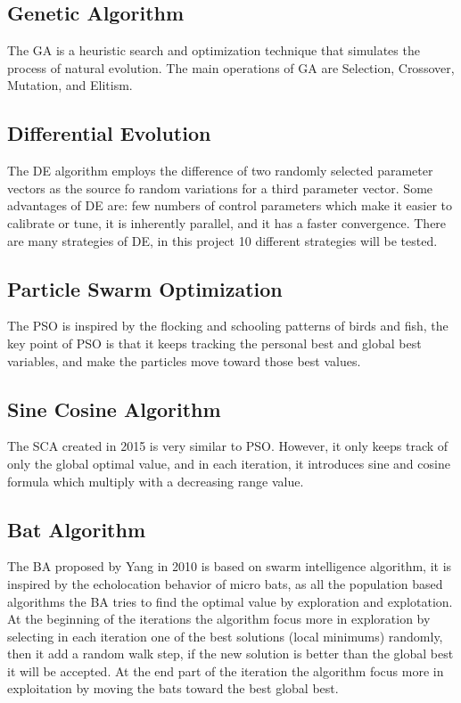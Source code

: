 \documentclass[12pt]{article}
\begin{document}
	\subsection{Genetic Algorithm}
    
    The GA is a heuristic search and optimization technique that simulates the process of natural evolution. The main operations of GA are Selection, Crossover, Mutation, and Elitism.
    
    \subsection{Differential Evolution}
    The DE algorithm employs the difference of two randomly selected parameter vectors as the source fo random variations for a third parameter vector. Some advantages of DE are: few numbers of control parameters which make it easier to calibrate or tune, it is inherently parallel, and it has a faster convergence. 
    There are many strategies of DE, in this project 10 different strategies will be tested.
    
    \subsection{Particle Swarm Optimization}
    The PSO is inspired by the flocking and schooling patterns of birds and fish, the key point of PSO is that it keeps tracking the personal best and global best variables, and make the particles move toward those best values.
    
	\subsection{Sine Cosine Algorithm}
    The SCA created in 2015 is very similar to PSO. However, it only keeps track of only the global optimal value, and in each iteration, it introduces sine and cosine formula which multiply with a decreasing range value.
    
	\subsection{Bat Algorithm}
	The BA proposed by Yang in 2010 is based on swarm intelligence algorithm, it is inspired by the echolocation behavior of micro bats, as all the population based algorithms the BA tries to find the optimal value by exploration and explotation. At the beginning of the iterations the algorithm focus more in exploration by selecting in each iteration one of the best solutions (local minimums) randomly, then it add a random walk step, if the new solution is better than the global best it will be accepted. At the end part of the iteration the algorithm focus more in exploitation by moving the bats toward the best global best.
\end{document}
